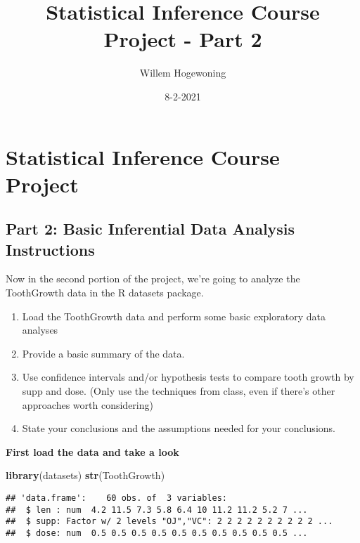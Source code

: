 \documentclass[
]{article}
\title{Statistical Inference Course Project - Part 2}
\author{Willem Hogewoning}
\date{8-2-2021}
\newenvironment{Shaded}{\begin{snugshade}}{\end{snugshade}}
\newcommand{\KeywordTok}[1]{\textcolor[rgb]{0.13,0.29,0.53}{\textbf{#1}}}
\newcommand{\NormalTok}[1]{#1}
\providecommand{\tightlist}{%
  \setlength{\itemsep}{0pt}\setlength{\parskip}{0pt}}
\begin{document}
\maketitle

\hypertarget{statistical-inference-course-project}{%
\section{Statistical Inference Course
Project}\label{statistical-inference-course-project}}

\hypertarget{part-2-basic-inferential-data-analysis-instructions}{%
\subsection{Part 2: Basic Inferential Data Analysis
Instructions}\label{part-2-basic-inferential-data-analysis-instructions}}

Now in the second portion of the project, we're going to analyze the
ToothGrowth data in the R datasets package.

\begin{enumerate}
\def\labelenumi{\arabic{enumi}.}
\tightlist
\item
  Load the ToothGrowth data and perform some basic exploratory data
  analyses
\item
  Provide a basic summary of the data.
\item
  Use confidence intervals and/or hypothesis tests to compare tooth
  growth by supp and dose. (Only use the techniques from class, even if
  there's other approaches worth considering)
\item
  State your conclusions and the assumptions needed for your
  conclusions.
\end{enumerate}

\textbf{First load the data and take a look}

\begin{Shaded}
\begin{Highlighting}[]
\KeywordTok{library}\NormalTok{(datasets)}
\KeywordTok{str}\NormalTok{(ToothGrowth)}
\end{Highlighting}
\end{Shaded}

\begin{verbatim}
## 'data.frame':    60 obs. of  3 variables:
##  $ len : num  4.2 11.5 7.3 5.8 6.4 10 11.2 11.2 5.2 7 ...
##  $ supp: Factor w/ 2 levels "OJ","VC": 2 2 2 2 2 2 2 2 2 2 ...
##  $ dose: num  0.5 0.5 0.5 0.5 0.5 0.5 0.5 0.5 0.5 0.5 ...
\end{verbatim}
\end{document}
